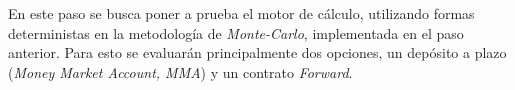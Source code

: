 \noindent En este paso se busca poner a prueba el motor de cálculo, utilizando formas deterministas en la metodología de \textit{Monte-Carlo}, implementada en el paso anterior. Para esto se evaluarán principalmente dos opciones, un depósito a plazo (\textit{Money Market Account, MMA}) y un contrato \textit{Forward}.


